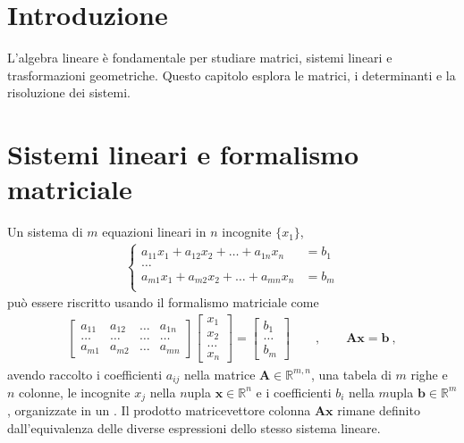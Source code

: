 \documentclass[letterpaper,10pt,italian]{jupyterBook}
\begin{document}
\section{Introduzione}
\label{\detokenize{ch/algebra/linear-algebra:introduzione}}\label{\detokenize{ch/algebra/linear-algebra:math-hs-algebra-linear-intro}}
\sphinxAtStartPar
L’algebra lineare è fondamentale per studiare matrici, sistemi lineari e trasformazioni geometriche. Questo capitolo esplora le matrici, i determinanti e la risoluzione dei sistemi.


\section{Sistemi lineari e formalismo matriciale}
\label{\detokenize{ch/algebra/linear-algebra:sistemi-lineari-e-formalismo-matriciale}}
\sphinxAtStartPar
Un sistema di \(m\) equazioni lineari in \(n\) incognite \(\{ x_1 \}\),
\begin{equation*}
\begin{split}\begin{cases}
 a_{11} x_1 + a_{12} x_2 + \dots + a_{1n} x_n & = b_1 \\
 \dots \\
 a_{m1} x_1 + a_{m2} x_2 + \dots + a_{mn} x_n & = b_m \\
\end{cases}\end{split}
\end{equation*}
\sphinxAtStartPar
può essere riscritto usando il formalismo matriciale come
\begin{equation*}
\begin{split}
\begin{bmatrix} a_{11} & a_{12} & \dots & a_{1n} \\ \dots & \dots & \dots & \dots \\ a_{m1} & a_{m2} & \dots & a_{mn} \end{bmatrix} \begin{bmatrix} x_1 \\ x_2 \\ \dots \\ x_n \end{bmatrix} = \begin{bmatrix} b_1 \\ \dots \\ b_m \end{bmatrix}
\qquad , \qquad
\mathbf{A} \mathbf{x} = \mathbf{b} \ ,
\end{split}
\end{equation*}
\sphinxAtStartPar
avendo raccolto i coefficienti \(a_{ij}\) nella matrice \(\mathbf{A} \in \mathbb{R}^{m,n}\), una tabela di \(m\) righe e \(n\) colonne, le incognite \(x_j\) nella \(n\)\sphinxhyphen{}upla \(\mathbf{x} \in \mathbb{R}^n\) e i coefficienti \(b_i\) nella \(m\)\sphinxhyphen{}upla \(\mathbf{b} \in \mathbb{R}^m\), organizzate in un . Il prodotto matrice\sphinxhyphen{}vettore colonna \(\mathbf{A} \mathbf{x}\) rimane definito dall’equivalenza delle diverse espressioni dello stesso sistema lineare.
\end{document}
